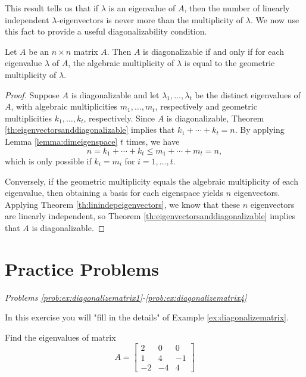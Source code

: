 \documentclass{ximera}
\begin{document}
This result tells us that if $\lambda$ is an eigenvalue of $A$, then
the number of linearly independent $\lambda$-eigenvectors
is never more than the multiplicity of $\lambda$. We now use this fact to provide a useful diagonalizability condition.

\begin{theorem}\label{th:diagonalizability}
Let $A$ be an $n \times n$ matrix $A$. Then $A$ is diagonalizable if and only if for each eigenvalue $\lambda$ of $A$, the algebraic multiplicity of $\lambda$ is equal to the geometric multiplicity of $\lambda$.
\end{theorem}

\begin{proof}
Suppose $A$ is diagonalizable and let $\lambda_1, \ldots, \lambda_t$ be the distinct eigenvalues of $A$, with algebraic multiplicities $m_1, \ldots, m_t$, respectively and geometric multiplicities $k_1, \ldots, k_t$, respectively.  Since $A$ is diagonalizable, Theorem \ref{th:eigenvectorsanddiagonalizable} implies that $ k_1+\cdots+k_t=n$.  By applying Lemma \ref{lemma:dimeigenspace} $t$ times, we have
$$n = k_1+\cdots+k_t \le m_1+\cdots+m_t = n,$$
which is only possible if $k_i=m_i$ for $i=1,\ldots,t$.

Conversely, if the geometric multiplicity equals the algebraic multiplicity of each eigenvalue, then obtaining a basis for each eigenspace yields $n$ eigenvectors.  Applying Theorem \ref{th:linindepeigenvectors}, we know that these $n$ eigenvectors are linearly independent, so Theorem \ref{th:eigenvectorsanddiagonalizable} implies that $A$ is diagonalizable.
\end{proof}

\section*{Practice Problems}
\emph{Problems \ref{prob:ex:diagonalizematrix1}-\ref{prob:ex:diagonalizematrix4}}

In this exercise you will "fill in the details" of Example \ref{ex:diagonalizematrix}.

\begin{problem}\label{prob:ex:diagonalizematrix1}
Find the eigenvalues of matrix 
\begin{equation*}
A=\begin{bmatrix}
2 & 0 & 0 \\
1 & 4 & -1 \\
-2 & -4 & 4
\end{bmatrix}
\end{equation*}
\end{problem} 
\end{document}
